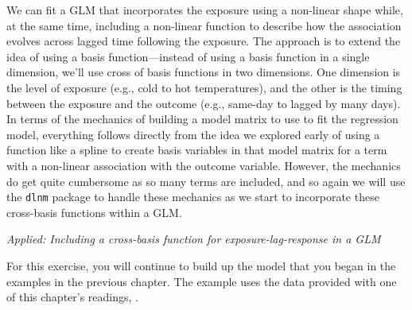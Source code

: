 \documentclass[
]{book}
\begin{document}
We can fit a GLM that incorporates the exposure using a non-linear shape while, at the
same time, including a non-linear function to describe how the association evolves
across lagged time following the exposure. The approach is to extend the idea of
using a basis function---instead of using a basis function in a single dimension, we'll
use cross of basis functions in two dimensions. One dimension is the level of exposure
(e.g., cold to hot temperatures), and the other is the timing between the exposure and
the outcome (e.g., same-day to lagged by many days). In terms of the mechanics of
building a model matrix to use to fit the regression model, everything follows directly
from the idea we explored early of using a function like a spline to create basis
variables in that model matrix for a term with a non-linear association with the
outcome variable. However, the mechanics do get quite cumbersome as so many terms are
included, and so again we will use the \texttt{dlnm} package to handle these mechanics as we
start to incorporate these cross-basis functions within a GLM.

\emph{Applied: Including a cross-basis function for exposure-lag-response in a GLM}

For this exercise, you will continue to build up the model that you began in
the examples in the previous chapter. The example uses the data provided with
one of this chapter's readings, \citet{vicedo2019hands}.
\end{document}
